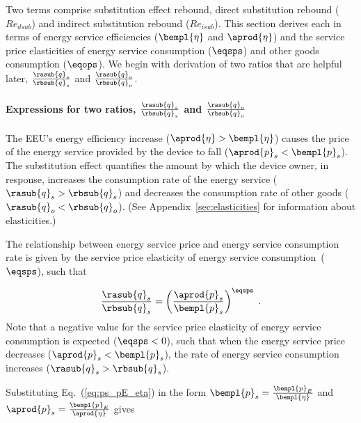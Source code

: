 \subsubsection{\Subeffect{}} 
\label{sec:Re_sub}

Two terms comprise substitution effect rebound,
direct substitution rebound ($Re_{dsub}$) and
indirect substitution rebound ($Re_{isub}$).
This section derives each in terms of 
energy service efficiencies ($\bempl{\eta}$ and $\aprod{\eta}$) and
the service price elasticities 
of energy service consumption ($\eqsps$) and
other goods consumption ($\eqops$).
We begin with derivation of two ratios that are helpful later,
$\frac{\rasub{q}_s}{\rbsub{q}_s}$ and
$\frac{\rasub{q}_o}{\rbsub{q}_o}$.


\paragraph{Expressions for two ratios, $\frac{\rasub{q}_s}{\rbsub{q}_s}$ and $\frac{\rasub{q}_o}{\rbsub{q}_o}$}
\label{sec:two_ratios}

The EEU's energy efficiency increase
($\aprod{\eta} > \bempl{\eta}$)
causes the price of the energy service provided by the device to fall
($\aprod{p}_s < \bempl{p}_s$).
The substitution effect quantifies the amount by which
the device owner, in response,
increases the consumption rate of the energy service ($\rasub{q}_s > \rbsub{q}_s$) and
decreases the consumption rate of other goods ($\rasub{q}_o < \rbsub{q}_o$).
(See Appendix~\ref{sec:elasticities} for information about elasticities.)

The relationship between energy service price and energy service consumption rate
is given by the service price elasticity of energy service consumption~($\eqsps$),
such that

\begin{equation}
  \frac{\rasub{q}_s}{\rbsub{q}_s} = \left( \frac{\aprod{p}_s}{\bempl{p}_s} \right)^{\eqsps} \; .
\end{equation}
%
Note that a negative value for the service price elasticity of energy service consumption
is expected ($\eqsps < 0$),
such that when the energy service price decreases ($\aprod{p}_s < \bempl{p}_s$),
the rate of energy service consumption increases ($\rasub{q}_s > \rbsub{q}_s$).

Substituting Eq.~(\ref{eq:ps_pE_eta}) in the form
$\bempl{p}_s = \frac{\bempl{p}_E}{\bempl{\eta}}$ and
$\aprod{p}_s = \frac{\bempl{p}_E}{\aprod{\eta}}$
gives

